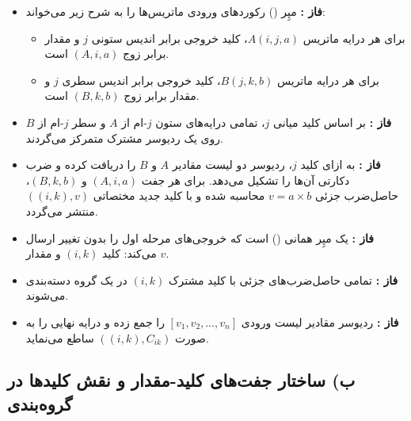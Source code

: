 \documentclass[11pt,a4paper]{article}
\begin{document}
	\begin{tcolorbox}[primarycard, title={مرحله اول: تولید ضرب‌های جزئی (\lr{Partial Products Generation})}]
		\small
		\begin{itemize}
			\item \textbf{فاز :} مپِر () رکوردهای ورودی ماتریس‌ها را به شرح زیر می‌خواند:
			\begin{itemize}
				\item برای هر درایه ماتریس $A(i, j, a)$، کلید خروجی برابر اندیس ستونی $j$ و مقدار برابر زوج $(A, i, a)$ است.
				\item برای هر درایه ماتریس $B(j, k, b)$، کلید خروجی برابر اندیس سطری $j$ و مقدار برابر زوج $(B, k, b)$ است.
			\end{itemize}
			\item \textbf{فاز :} بر اساس کلید میانی $j$، تمامی درایه‌های ستون $j$-ام از $A$ و سطر $j$-ام از $B$ روی یک ردیوسر مشترک متمرکز می‌گردند.
			\item \textbf{فاز :} به ازای کلید $j$، ردیوسر دو لیست مقادیر $A$ و $B$ را دریافت کرده و ضرب دکارتی آن‌ها را تشکیل می‌دهد. برای هر جفت $(A, i, a)$ و $(B, k, b)$، حاصل‌ضرب جزئی $v = a \times b$ محاسبه شده و با کلید جدید مختصاتی $((i, k), v)$ منتشر می‌گردد.
		\end{itemize}
	\end{tcolorbox}
	
	\vspace{0.2cm}
	
	\begin{tcolorbox}[accentcard, title={مرحله دوم: تجمیع مقادیر نهایی (\lr{Aggregation Phase})}]
		\small
		\begin{itemize}
			\item \textbf{فاز :} یک مپِر همانی () است که خروجی‌های مرحله اول را بدون تغییر ارسال می‌کند: کلید $(i, k)$ و مقدار $v$.
			\item \textbf{فاز :} تمامی حاصل‌ضرب‌های جزئی با کلید مشترک $(i, k)$ در یک گروه دسته‌بندی می‌شوند.
			\item \textbf{فاز :} ردیوسر مقادیر لیست ورودی $[v_1, v_2, \dots, v_n]$ را جمع زده و درایه نهایی را به صورت $((i, k), C_{ik})$ ساطع می‌نماید.
		\end{itemize}
	\end{tcolorbox}
	
	\subsection{ب) ساختار جفت‌های کلید-مقدار و نقش کلیدها در گروه‌بندی}
	
\end{document}
